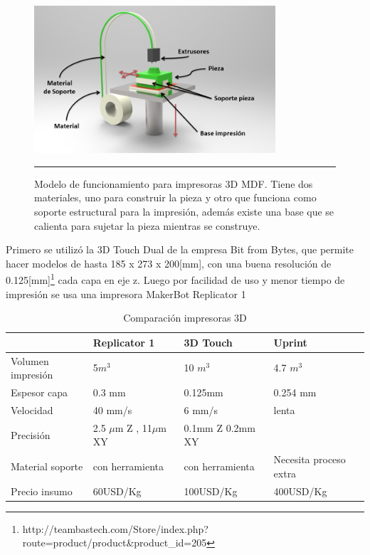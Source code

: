 \begin{figure}[htbp]
	\centering
		\includegraphics[width=0.8\textwidth]{./Figures/3Dprint.png}
		\rule{35em}{0.5pt}
	\caption[3Dprint]{Modelo de funcionamiento para impresoras 3D MDF. Tiene dos materiales, uno para construir la pieza y otro que funciona como soporte estructural para la impresión, además existe una base que se calienta para sujetar la pieza mientras se construye.}
	\label{fig:3Dprint}
\end{figure}	

Primero se utilizó la 3D Touch Dual de la empresa Bit from Bytes, que permite hacer modelos de hasta 185 x 273 x 200[mm], con una buena resolución de 0.125[mm]\footnote{http://teambastech.com/Store/index.php?route=product/product\&product\_id=205} cada capa en eje z. Luego por facilidad de uso y menor tiempo de impresión se usa una impresora MakerBot Replicator 1

\begin{table}\small 
    \begin{tabular}{l|lll}
    ~                     & Replicator 1                          & 3D Touch                   & Uprint      \\ \hline
    Volumen impresión         & 5$ m^{3} $                            & 10 $m^{3}$                 & 4.7 $m^{3}$ \\
    Espesor capa      & 0.3 mm                                & 0.125mm                    & 0.254 mm    \\
    Velocidad                 & 40 mm/s                               & 6 mm/s                     & lenta       \\
    Precisión & 2.5 $ \mu $m Z , 11$\mu$m XY  & 0.1mm Z  0.2mm XY  & ~           \\
    Material soporte  & con herramienta &con herramienta  & Necesita proceso extra      \\
    Precio insumo   &60USD/Kg	                          &           100USD/Kg         & 400USD/Kg        \\
    
    \end{tabular}
    \caption {Comparación impresoras 3D}
\end{table}

